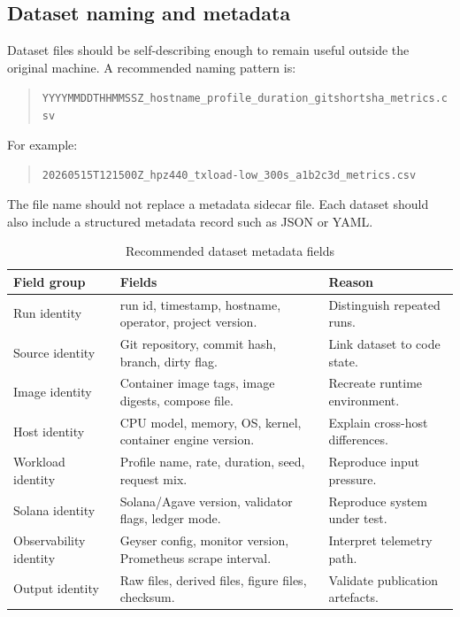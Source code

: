 \documentclass[11pt,a4paper]{article}
\begin{document}
\subsection{Dataset naming and metadata}
\label{subsec:dataset-naming}

Dataset files should be self-describing enough to remain useful outside the original machine. A recommended naming pattern is:

\begin{quote}\small
\texttt{YYYYMMDDTHHMMSSZ\_hostname\_profile\_duration\_gitshortsha\_metrics.csv}
\end{quote}

For example:

\begin{quote}\small
\texttt{20260515T121500Z\_hpz440\_txload-low\_300s\_a1b2c3d\_metrics.csv}
\end{quote}

The file name should not replace a metadata sidecar file. Each dataset should also include a structured metadata record such as JSON or YAML.

\begin{table}[H]
\centering
\caption{Recommended dataset metadata fields}
\label{tab:metadata}
\begin{tabularx}{\textwidth}{L{3.5cm}Y Y}
\toprule
\textbf{Field group} & \textbf{Fields} & \textbf{Reason} \\
\midrule
Run identity & run id, timestamp, hostname, operator, project version. & Distinguish repeated runs. \\
Source identity & Git repository, commit hash, branch, dirty flag. & Link dataset to code state. \\
Image identity & Container image tags, image digests, compose file. & Recreate runtime environment. \\
Host identity & CPU model, memory, OS, kernel, container engine version. & Explain cross-host differences. \\
Workload identity & Profile name, rate, duration, seed, request mix. & Reproduce input pressure. \\
Solana identity & Solana/Agave version, validator flags, ledger mode. & Reproduce system under test. \\
Observability identity & Geyser config, monitor version, Prometheus scrape interval. & Interpret telemetry path. \\
Output identity & Raw files, derived files, figure files, checksum. & Validate publication artefacts. \\
\bottomrule
\end{tabularx}
\end{table}
\end{document}
